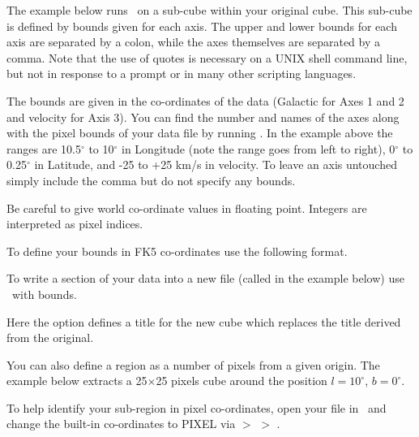 \documentclass[11pt,oneside,chapters]{starlink}
\begin{document}
The example below runs \stats\ on a sub-cube within your original
cube. This sub-cube is defined by bounds given for each axis. The
upper and lower bounds for each axis are separated by a colon, while
the axes themselves are separated by a comma. Note that the use of
quotes is necessary on a UNIX shell command line, but not in response
to a prompt or in many other scripting languages.

\begin{terminalv}
\end{terminalv}
The bounds are given in the co-ordinates of the data (Galactic for Axes
1 and 2 and velocity for Axis 3). You can find the number and names of
the axes along with the pixel bounds of your data file by running
\ndftrace. In the example above the ranges are 10.5$^\circ$ to
10$^\circ$ in Longitude (note the range goes from left to right),
0$^\circ$ to 0.25$^\circ$ in Latitude, and -25 to +25 km/s in
velocity. To leave an axis untouched simply include the comma but do
not specify any bounds.


\begin{tip}
Be careful to give world co-ordinate values in floating point.
Integers are interpreted as pixel indices.
\end{tip}

To define your bounds in FK5 co-ordinates use the following format.
\begin{terminalv}
\end{terminalv}

To write a section of your data into a new file (called
 in the example below) use \ndfcopy\ with bounds.
\begin{terminalv}
\end{terminalv}
Here the option  defines a title for the new cube which
replaces the title derived from the original.

You can also define a region as a number of pixels from a given
origin. The example below extracts a 25$\times$25 pixels cube around
the position $l=10^\circ$, $b=0^\circ$.
\begin{terminalv}
\end{terminalv}

\begin{tip}
To help identify your sub-region in pixel co-ordinates, open your
file in \gaia\ and change the built-in co-ordinates to PIXEL via
 $>$  $>$
.
\end{tip}
\end{document}
